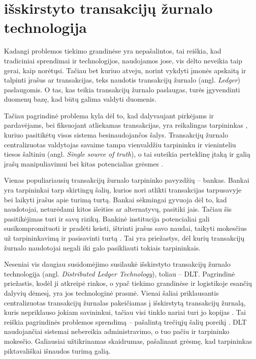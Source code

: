 
\section {išskirstyto transakcijų žurnalo technologija}

Kadangi problemos tiekimo grandinėse yra nepašalintos, tai reiškia, kad tradiciniai sprendimai ir technologijos, naudojamos jose, vis dėlto neveikia taip gerai, kaip norėtųsi. Tačiau bet kuriuo atveju, norint vykdyti įmonės apskaitą ir talpinti įrašus ar transakcijas, teks naudotis transakcijų žurnalo (angl. \textit{Ledger}) paslaugomis. O tas, kas teikia transakcijų žurnalo paslaugas, turės įgyvendinti duomenų bazę, kad būtų galima valdyti duomenis.

Tačiau pagrindinė problema kyla dėl to, kad dalyvaujant pirkėjams ir pardavėjams, bei fiksuojant atliekamas transakcijas, yra reikalingas tarpininkas \cite{gao2018coc}, kuriuo pasitikėtų visos sistema besinaudojančos šalys. Transakcijų žurnalo centralizuotas valdytojas savaime tampa vienvaldžiu tarpininku ir vieninteliu tiesos šaltiniu (angl. \textit{Single source of truth}), o tai suteikia perteklinę įtaką ir galią įrašų manipuliavimui bei kitas potencialias grėsmes \cite{jiang2017much, shyamasundar2018blockchain}. 

Vienas populiariausių transakcijų žurnalo tarpininko pavyzdžių – bankas. Bankai yra tarpininkai tarp skirtingų šalių, kurios nori atlikti transakcijas tarpusavyje bei laikyti įrašus apie turimą turtą. Bankai sėkmingai gyvuoja dėl to, kad naudotojai, neturėdami kitos išeities ar alternatyvų, pasitiki jais. Tačiau šis pasitikėjimas turi ir savų rizikų. Bankinė institucija potencialiai gali susikompromituoti ir pradėti keisti, ištrinti įrašus savo naudai, taikyti mokesčius už tarpininkavimą ir pasisavinti turtą \cite{shyamasundar2018blockchain}. Tai yra priežastys, dėl kurių transakcijų žurnalo naudotojai negali iki galo pasikliauti tokiais tarpininkais.

Neseniai vis daugiau susidomėjimo susilaukė išskirstyto transakcijų žurnalo technologija (angl. \textit{Distributed Ledger Technology}), toliau – DLT. Pagrindinė priežastis, kodėl ji atkreipė rinkos, o ypač tiekimo grandinėse ir logistikoje esančių dalyvių dėmesį, yra jos technologinė prasmė. Vienai šaliai priklausantis centralizuotas transakcijų žurnalas pakeičiamas į išskirstytą transakcijų žurnalą, kuris nepriklauso jokiam savininkui, tačiau visi tinklo nariai turi jo kopijas \cite{shyamasundar2018blockchain}. Tai reiškia pagrindinės problemos sprendimą – pašalintą trečiųjų šalių poreikį \cite{shyamasundar2018blockchain}. DLT naudojančiai sistemai nebereikia administravimo, o tuo pačiu ir tarpininko mokesčio. Galiausiai užtikrinamas skaidrumas, pašalinant grėsmę, kad tarpininkas piktavališkai išnaudos turimą galią.



